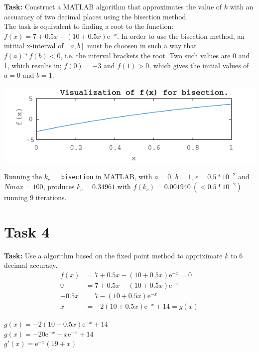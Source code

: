 \documentclass{article}
\begin{document}
  \textbf{Task:}
  Construct a MATLAB algorithm that approximates the value of $k$ with an
  accuaracy of two decimal places using the bisection method. \\

  \noindent
  The task is equivalent to finding a root to the function:
  $ f(x) = 7 + 0.5x - (10 + 0.5x)\mathrm{e}^{-x} $.
  In order to use the bisection method, an intitial x-interval of $[a, b]$ must
  be choosen in such a way that $f(a) * f(b) < 0$, i.e. the interval brackets the
  root. Two such values are 0 and 1, which results in; $f(0) = -3$ and $f(1) >
  0$, which gives the initial values of $a=0$ and $b=1$.

  \begin{center}
    \includegraphics{figs/t3_check.pdf}
  \end{center}

  \noindent
  Running the $k_c =\ $\texttt{bisection} in MATLAB, with $a=0$, $b=1$,
  $\epsilon=0.5*10^{-2}$ and $Nmax=100$, produces $k_c = 0.34961$ with $f(k_c) =
  0.001940 \ ( < 0.5*10^{-2} )$ running 9 iterations.

\section*{Task 4}

  \textbf{Task:} Use a algorithm based on the fixed point method to appriximate
  $k$ to 6 decimal accuracy.
  \begin{align*}
     f(x) &= 7 + 0.5x - (10 + 0.5x)\mathrm{e}^{-x} = 0\\
     0  &= 7 + 0.5x - (10 + 0.5x)\mathrm{e}^{-x} \\
     - 0.5x  &= 7 - (10 + 0.5x)\mathrm{e}^{-x} \\
     x  &= -2(10 + 0.5x)\mathrm{e}^{-x} + 14  = g(x)
  \end{align*}

  \noindent
  $ g(x) = -2(10 + 0.5x)\mathrm{e}^{-x} + 14 $ \\
  $ g(x) = -20\mathrm{e}^{-x} - x\mathrm{e}^{-x} + 14 $ \\
  $ g'(x) = \mathrm{e}^{-x}(19 + x)$ \\
\end{document}
